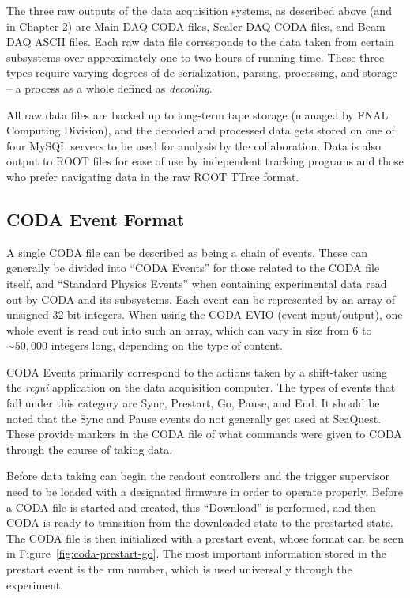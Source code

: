 The three raw outputs of the data acquisition systems, as described above (and in Chapter 2) are Main DAQ CODA files, Scaler DAQ CODA files, and Beam DAQ ASCII files. Each raw data file corresponds to the data taken from certain subsystems over approximately one to two hours of running time. These three types require varying degrees of de-serialization, parsing, processing, and storage -- a process as a whole defined as \emph{decoding}. 

All raw data files are backed up to long-term tape storage (managed by FNAL Computing Division), and the decoded and processed data gets stored on one of four MySQL servers to be used for analysis by the collaboration. Data is also output to ROOT files for ease of use by independent tracking programs and those who prefer navigating data in the raw ROOT TTree format.

\subsection{CODA Event Format}

A single CODA file can be described as being a chain of events. These can generally be divided into ``CODA Events'' for those related to the CODA file itself, and ``Standard Physics Events'' when containing experimental data read out by CODA and its subsystems. Each event can be represented by an array of unsigned 32-bit integers. When using the CODA EVIO (event input/output), one whole event is read out into such an array, which can vary in size from 6 to $\sim50,000$ integers long, depending on the type of content.

CODA Events primarily correspond to the actions taken by a shift-taker using the \emph{rcgui} application on the data acquisition computer. The types of events that fall under this category are Sync, Prestart, Go, Pause, and End. It should be noted that the Sync and Pause events do not generally get used at SeaQuest. These provide markers in the CODA file of what commands were given to CODA through the course of taking data. 

Before data taking can begin the readout controllers and the trigger supervisor need to be loaded with a designated firmware in order to operate properly. Before a CODA file is started and created, this ``Download'' is performed, and then CODA is ready to transition from the downloaded state to the prestarted state. The CODA file is then initialized with a prestart event, whose format can be seen in Figure~\ref{fig:coda-prestart-go}. The most important information stored in the prestart event is the run number, which is used universally through the experiment. 

